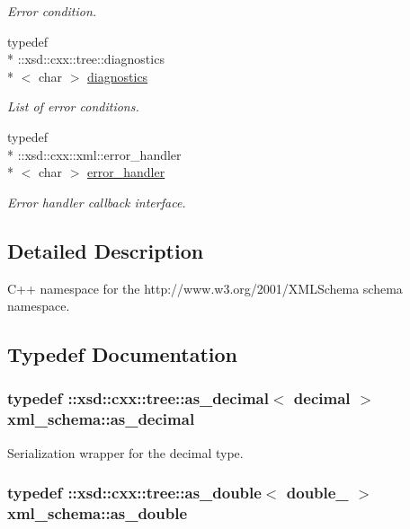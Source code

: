 \begin{DoxyCompactItemize}
\begin{DoxyCompactList}\small\item\em Error condition. \end{DoxyCompactList}\item 
typedef \\*
\+::xsd\+::cxx\+::tree\+::diagnostics\\*
$<$ char $>$ \hyperlink{namespacexml__schema_a62cc106990ec99fdaf2f3364d98cfabd}{diagnostics}
\begin{DoxyCompactList}\small\item\em List of error conditions. \end{DoxyCompactList}\item 
typedef \\*
\+::xsd\+::cxx\+::xml\+::error\+\_\+handler\\*
$<$ char $>$ \hyperlink{namespacexml__schema_abdee01986b8e16f04af47dd12038261e}{error\+\_\+handler}
\begin{DoxyCompactList}\small\item\em Error handler callback interface. \end{DoxyCompactList}\end{DoxyCompactItemize}


\subsection{Detailed Description}
C++ namespace for the http\+://www.w3.\+org/2001/\+X\+M\+L\+Schema schema namespace. 

\subsection{Typedef Documentation}
\hypertarget{namespacexml__schema_a60dfdca63dedf12d8a524c0496def693}{
\subsubsection[{as\+\_\+decimal}]{\setlength{\rightskip}{0pt plus 5cm}typedef \+::xsd\+::cxx\+::tree\+::as\+\_\+decimal$<$ {\bf decimal} $>$ {\bf xml\+\_\+schema\+::as\+\_\+decimal}}}\label{namespacexml__schema_a60dfdca63dedf12d8a524c0496def693}


Serialization wrapper for the decimal type. 

\hypertarget{namespacexml__schema_ae0eab1db5641db3b286a63a0ebe40351}{
\subsubsection[{as\+\_\+double}]{\setlength{\rightskip}{0pt plus 5cm}typedef \+::xsd\+::cxx\+::tree\+::as\+\_\+double$<$ {\bf double\+\_\+} $>$ {\bf xml\+\_\+schema\+::as\+\_\+double}}}\label{namespacexml__schema_ae0eab1db5641db3b286a63a0ebe40351}


